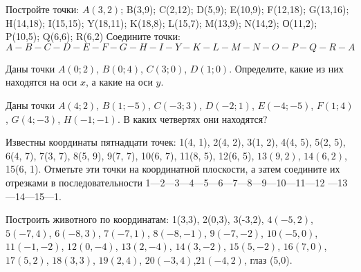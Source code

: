 \begin{class}[number=6]
	\begin{listofex}
		\item Постройте точки:
		\( A(3,2) \); B(3,9); C(2,12); D(5,9); E(10,9);
		F(12,18); G(13,16); H(14,18); I(15,15);
		Y(18,11); K(18,8); L(15,7); M(13,9);
		N(14,2); О(11,2); P(10,5); Q(6,6); R(6,2) 
		Соедините точки:
		\( A-B-C-D-E-F-G-H-I-Y-K-L-M-N-O-P-
		Q-R-A \)
		\item Даны точки \( A (0;2) \), \( B (0;4) \), \( C (3;0) \), \( D (1;0) \). Определите, какие из них находятся на оси \( x \), а какие на оси \( y \).
		\item Даны точки \( A(4;2) \), \( B(1;-5) \), \( C(-3;3) \), \( D(-2;1) \), \( E(-4;-5) \), \( F(1;4) \), \( G(4;-3) \), \( H(-1;-1) \). В каких четвертях они находятся?
		\item Известны координаты пятнадцати точек: 1(4, 1), 2(4, 2), 3(1, 2), 4(4, 5), 5(2, 5), 6(4, 7), 7(3, 7), 8(5, 9), 9(7, 7), 10(6, 7), 11(8, 5), 12(6, 5), \( 13(9, 2) \), \( 14(6, 2) \), 15(6, 1). Отметьте эти точки на координатной плоскости, а затем соедините их отрезками в последовательности 1—2—3—4—5—6—7—8—9—10—11—12 —13—14—15—1. 
		\item Построить животного по координатам:
		1(3,3), 2(0,3), 3(-3,2), \( 4(-5,2) \), \(  5(-7,4) \), \( 6(-8,3) \), \( 7(-7,1) \), \( 8(-8,-1) \), \( 9(-7,-2) \), \( 10(-5,0) \), \( 11(-1,-2) \), \( 12(0,-4) \), \( 13(2,-4) \), \( 14(3,-2) \), \( 15(5,-2) \), \( 16(7,0) \), \( 17(5,2) \), \( 18(3,3) \), \( 19(2,4) \), \( 20(-3,4) \),\(  21(-4,2) \), глаз (5,0).
	\end{listofex}
\end{class}

